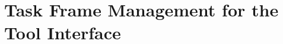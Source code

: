 %
%
%
%
%
%
%
%
%
%
%
%
%


\chapter{Task Frame Management for the Tool Interface}
\label{chap:frames}


